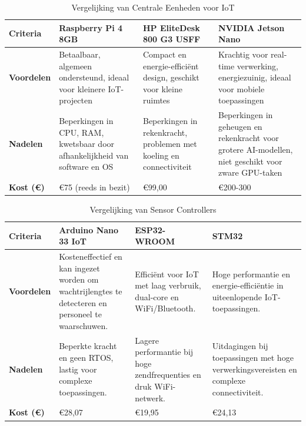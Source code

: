 \begin{table}[h!]
    \small
    \caption{Vergelijking van Centrale Eenheden voor IoT \autocite{Calvo2016, Hosny2023, SainzRaso2019, 王丁2014, Pham2024, Chatterjee2022}}
    \label{tab:vergelijking-centrale-eenheid}
    \begin{tabular}{|p{2cm}|p{3.8cm}|p{4cm}|p{4cm}|}
        \hline
        \textbf{Criteria} & \textbf{Raspberry Pi 4 8GB} & \textbf{HP EliteDesk 800 G3 USFF} & \textbf{NVIDIA Jetson Nano} \\
        \hline
        \textbf{Voordelen} & Betaalbaar, algemeen ondersteund, ideaal voor kleinere IoT-projecten & Compact en energie-efficiënt design, geschikt voor kleine ruimtes & Krachtig voor real-time verwerking, energiezuinig, ideaal voor mobiele toepassingen \\
        \hline
        \textbf{Nadelen} & Beperkingen in CPU, RAM, kwetsbaar door afhankelijkheid van software en OS & Beperkingen in rekenkracht, problemen met koeling en connectiviteit & Beperkingen in geheugen en rekenkracht voor grotere AI-modellen, niet geschikt voor zware GPU-taken  \\
        \hline
        \textbf{Kost (€)} & €75 (reeds in bezit) & €99,00 & €200-300 \\
        \hline
    \end{tabular}
\end{table}
\clearpage


\begin{table}[h!]
    \small
    \caption{Vergelijking van Sensor Controllers \autocite{Hussain2024, Viriyavisuthisakul2017, Spohn2020, Maier2017, Wang2020, Wu2020, Kovacshazy2024}}
    \label{tab:vergelijking-sensorcontroller}
    \begin{tabular}{|p{2cm}|p{4cm}|p{4cm}|p{4cm}|}
        \hline
        \textbf{Criteria} & \textbf{Arduino Nano 33 IoT} & \textbf{ESP32-WROOM} & \textbf{STM32} \\
        \hline
        \textbf{Voordelen} 
        & Kosteneffectief en kan ingezet worden om wachtrijlengtes te detecteren en personeel te waarschuwen. 
        & Efficiënt voor IoT met laag verbruik, dual-core en WiFi/Bluetooth. 
        & Hoge performantie en energie-efficiëntie in uiteenlopende IoT-toepassingen. \\
        \hline
        \textbf{Nadelen} 
        & Beperkte kracht en geen RTOS, lastig voor complexe toepassingen. 
        & Lagere performantie bij hoge zendfrequenties en druk WiFi-netwerk. 
        & Uitdagingen bij toepassingen met hoge verwerkingsvereisten en complexe connectiviteit. \\
        \hline
        \textbf{Kost (€)} 
        & €28,07 
        & €19,95 
        & €24,13 \\
        \hline
    \end{tabular}
\end{table}

